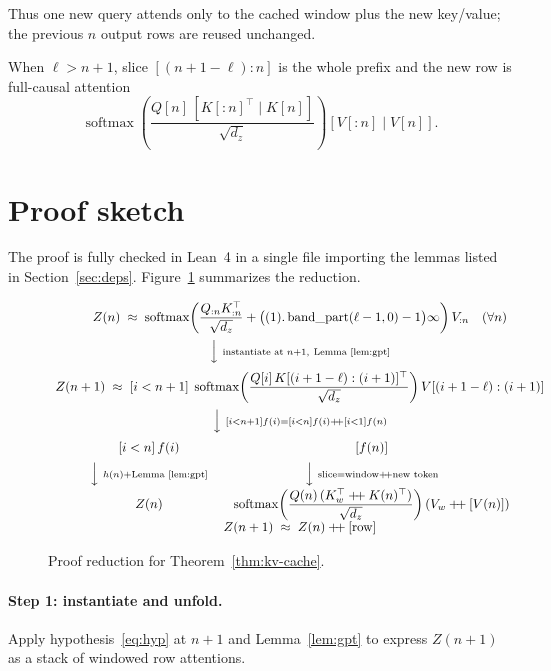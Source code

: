 \documentclass[11pt,a4paper]{article}
\newcommand{\bandpart}{\operatorname{band\_part}}
\newcommand{\rowop}{\operatorname{row}}
\newcommand{\concat}{\mathbin{+\mkern-4mu+}}
\newcommand{\XEq}{\approx}
\begin{document}
Thus one new query attends only to the cached window plus the new key/value; the previous $n$ output rows are reused unchanged.

When $\ell>n+1$, slice $[(n+1-\ell):n]$ is the whole prefix and the new row is full-causal attention
\[
\operatorname{softmax}\!\left(\frac{Q[n]\,[K[:n]^{\top}\mid K[n]]}{\sqrt{d_z}}\right)[V[:n]\mid V[n]].
\]

\section{Proof sketch}
\label{sec:proof}

The proof is fully checked in Lean~4 in a single file importing the lemmas listed in Section~\ref{sec:deps}.
Figure~\ref{fig:reduction} summarizes the reduction.

\begin{figure}[ht]
\centering
\[
\begin{array}{c}
Z(n)\;\XEq\;
\operatorname{softmax}\!\left(
\dfrac{Q_{:n}K_{:n}^{\top}}{\sqrt{d_{z}}}
+\bigl((1).\bandpart(\ell-1,0)-1\bigr)\infty
\right)V_{:n}
\quad(\forall n)
\\[1.1em]
\Big\downarrow\ \scriptstyle\text{instantiate at }n+1,\ \text{Lemma~\ref{lem:gpt}}
\\[0.9em]
Z(n+1)\;\XEq\;
[i<n+1]\;
\operatorname{softmax}\!\left(
\dfrac{Q[i]\,K[(i+1-\ell):(i+1)]^{\top}}{\sqrt{d_{z}}}
\right)
V[(i+1-\ell):(i+1)]
\\[1.1em]
\Big\downarrow\ \scriptstyle [i<n+1]f(i)=[i<n]f(i)\concat[i<1]f(n)
\\[0.9em]
\begin{array}{c@{\qquad}c}
[i<n]\,f(i) & [f(n)] \\[0.5em]
\Big\downarrow\ \scriptstyle h(n)+\text{Lemma~\ref{lem:gpt}} & \Big\downarrow\ \scriptstyle\text{slice}=\text{window}\concat\text{new token} \\[0.5em]
Z(n) &
\operatorname{softmax}\!\left(\dfrac{Q(n)\,(K_{w}^{\top}\concat K(n)^{\top})}{\sqrt{d_{z}}}\right)(V_{w}\concat[V(n)])
\end{array}
\\[1.6em]
Z(n+1)\;\XEq\; Z(n)\concat[\rowop]
\end{array}
\]
\caption{Proof reduction for Theorem~\ref{thm:kv-cache}.}
\label{fig:reduction}
\end{figure}

\paragraph{Step 1: instantiate and unfold.}
Apply hypothesis~\eqref{eq:hyp} at $n+1$ and Lemma~\ref{lem:gpt} to express $Z(n+1)$ as a stack of windowed row attentions.
\end{document}
